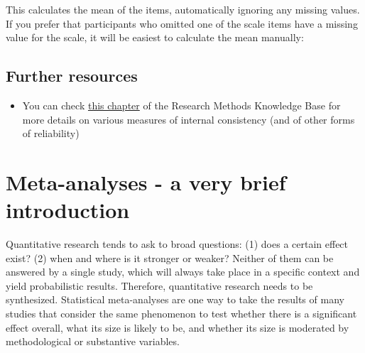 \documentclass[
]{book}
\newenvironment{Shaded}{\begin{snugshade}}{\end{snugshade}}
\newcommand{\DataTypeTok}[1]{\textcolor[rgb]{0.13,0.29,0.53}{#1}}
\newcommand{\DecValTok}[1]{\textcolor[rgb]{0.00,0.00,0.81}{#1}}
\newcommand{\KeywordTok}[1]{\textcolor[rgb]{0.13,0.29,0.53}{\textbf{#1}}}
\newcommand{\NormalTok}[1]{#1}
\newcommand{\OperatorTok}[1]{\textcolor[rgb]{0.81,0.36,0.00}{\textbf{#1}}}
\newcommand{\StringTok}[1]{\textcolor[rgb]{0.31,0.60,0.02}{#1}}
\providecommand{\tightlist}{%
  \setlength{\itemsep}{0pt}\setlength{\parskip}{0pt}}
\begin{document}
This calculates the mean of the items, automatically ignoring any missing values. If you prefer that participants who omitted one of the scale items have a missing value for the scale, it will be easiest to calculate the mean manually:

\begin{Shaded}
\end{Shaded}

\hypertarget{further-resources-survey}{%
\section{Further resources}\label{further-resources-survey}}

\begin{itemize}
\tightlist
\item
  You can check \href{https://socialresearchmethods.net/kb/types-of-reliability/\#internal-consistency-reliability}{this chapter} of the Research Methods Knowledge Base for more details on various measures of internal consistency (and of other forms of reliability)
\end{itemize}

\hypertarget{meta-analyses---a-very-brief-introduction}{%
\chapter{Meta-analyses - a very brief introduction}\label{meta-analyses---a-very-brief-introduction}}

Quantitative research tends to ask to broad questions: (1) does a certain effect exist? (2) when and where is it stronger or weaker? Neither of them can be answered by a single study, which will always take place in a specific context and yield probabilistic results. Therefore, quantitative research needs to be synthesized. Statistical meta-analyses are one way to take the results of many studies that consider the same phenomenon to test whether there is a significant effect overall, what its size is likely to be, and whether its size is moderated by methodological or substantive variables.
\end{document}
